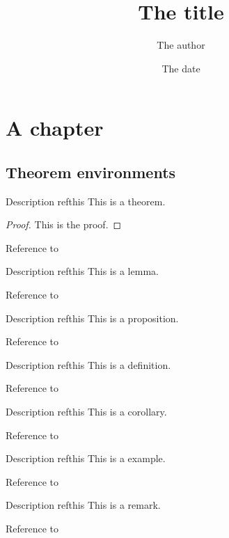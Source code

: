 \documentclass{my_thesis}
\title{The title}
\author{The author}
\date{The date}
\begin{document}
\maketitle

\chapter{A chapter}

\section{Theorem environments}

\begin{theorem}
{Description}
{refthis}
This is a theorem.
\end{theorem}
\begin{proof}
    This is the proof.
\end{proof}
Reference to 

\begin{lemma}
{Description}
{refthis}
This is a lemma.
\end{lemma}
Reference to 

\begin{proposition}
{Description}
{refthis}
This is a proposition.
\end{proposition}
Reference to 

\begin{definition}
{Description}
{refthis}
This is a definition.
\end{definition}
Reference to 

\begin{corollary}
{Description}
{refthis}
This is a corollary.
\end{corollary}
Reference to 

\begin{example}
{Description}
{refthis}
This is a example.
\end{example}
Reference to 

\begin{remark}
{Description}
{refthis}
This is a remark.
\end{remark}
Reference to 
\end{document}
